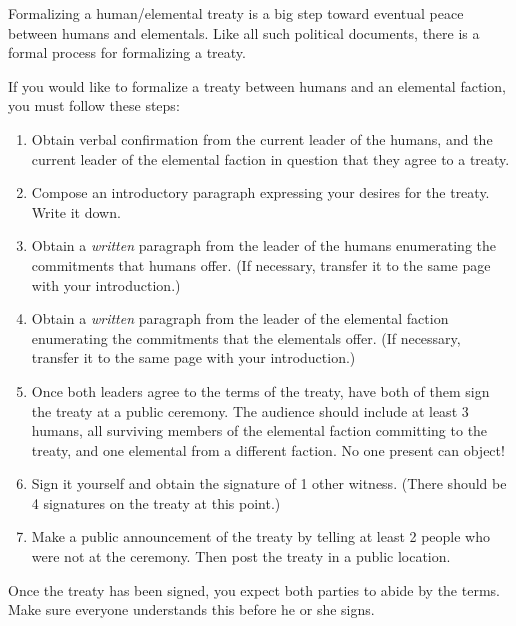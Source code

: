 \documentclass[green]{elementals}
\begin{document}
\name{\gTreaty{}}

Formalizing a human/elemental treaty is a big step toward eventual peace between humans and elementals. Like all such political documents, there is a formal process for formalizing a treaty.

If you would like to formalize a treaty between humans and an elemental faction, you must follow these steps:
\begin{enumerate}
  \item Obtain verbal confirmation from the current leader of the humans, and the current leader of the elemental faction in question that they agree to a treaty.
  \item Compose an introductory paragraph expressing your desires for the treaty.  Write it down.
  \item Obtain a \emph{written} paragraph from the leader of the humans enumerating the commitments that humans offer. (If necessary, transfer it to the same page with your introduction.)
  \item Obtain a \emph{written} paragraph from the leader of the elemental faction enumerating the commitments that the elementals offer. (If necessary, transfer it to the same page with your introduction.)
  \item Once both leaders agree to the terms of the treaty, have both of them sign the treaty at a public ceremony.  The audience should include at least 3 humans, all surviving members of the elemental faction committing to the treaty, and one elemental from a different faction.  No one present can object!
  \item Sign it yourself and obtain the signature of 1 other witness. (There should be 4 signatures on the treaty at this point.)
  \item Make a public announcement of the treaty by telling at least 2 people who were not at the ceremony.  Then post the treaty in a public location.
\end{enumerate}

Once the treaty has been signed, you expect both parties to abide by the terms. Make sure everyone understands this before he or she signs.
\end{document}
